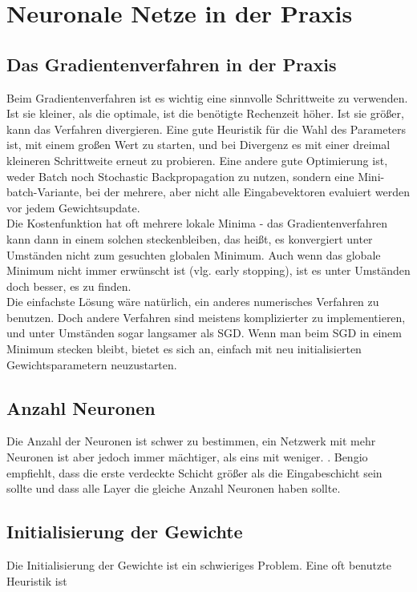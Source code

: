\section{Neuronale Netze in der Praxis}

\subsection{Das Gradientenverfahren in der Praxis}
Beim Gradientenverfahren ist es wichtig eine sinnvolle Schrittweite zu verwenden. Ist sie kleiner, als die optimale, ist die benötigte Rechenzeit höher. Ist sie größer, kann das Verfahren divergieren. Eine gute Heuristik für die Wahl des Parameters ist, mit einem großen Wert zu starten, und bei Divergenz es mit einer dreimal kleineren Schrittweite erneut zu probieren.
Eine andere gute Optimierung ist, weder Batch noch Stochastic Backpropagation zu nutzen, sondern eine Mini-batch-Variante, bei der mehrere, aber nicht alle Eingabevektoren evaluiert werden vor jedem Gewichtsupdate. \cite{bengio2012practical}\\
Die Kostenfunktion hat oft mehrere lokale Minima - das Gradientenverfahren kann dann in einem solchen steckenbleiben, das heißt, es konvergiert unter Umständen nicht zum gesuchten globalen Minimum. Auch wenn das globale Minimum nicht immer erwünscht ist (vlg. early stopping), ist es unter Umständen doch besser, es zu finden.\\
Die einfachste Lösung wäre natürlich, ein anderes numerisches Verfahren zu benutzen. Doch andere Verfahren sind meistens komplizierter zu implementieren, und unter Umständen sogar langsamer als SGD. Wenn man beim SGD in einem Minimum stecken bleibt, bietet es sich an, einfach mit neu initialisierten Gewichtsparametern neuzustarten.

\subsection{Anzahl Neuronen}
Die Anzahl der Neuronen ist schwer zu bestimmen, ein Netzwerk mit mehr Neuronen ist aber jedoch immer mächtiger, als eins mit weniger. . Bengio \cite{bengio2012practical} empfiehlt, dass die erste verdeckte Schicht größer als die Eingabeschicht sein sollte und dass alle Layer die gleiche Anzahl Neuronen haben sollte.

\subsection{Initialisierung der Gewichte}
Die Initialisierung der Gewichte ist ein schwieriges Problem. Eine oft benutzte Heuristik ist 

